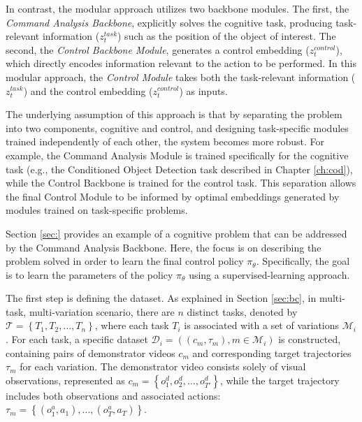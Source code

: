In contrast, the modular approach utilizes two backbone modules. The first, the \textit{Command Analysis Backbone}, explicitly solves the cognitive task, producing task-relevant information ($z^{task}_t$) such as the position of the object of interest. The second, the \textit{Control Backbone Module}, generates a control embedding ($z^{control}_t$), which directly encodes information relevant to the action to be performed. In this modular approach, the \textit{Control Module} takes both the task-relevant information ($z^{task}_t$) and the control embedding ($z^{control}_t$) as inputs.



The underlying assumption of this approach is that by separating the problem into two components, cognitive and control, and designing task-specific modules trained independently of each other, the system becomes more robust. For example, the Command Analysis Module is trained specifically for the cognitive task (e.g., the Conditioned Object Detection task described in Chapter \ref{ch:cod}), while the Control Backbone is trained for the control task. This separation allows the final Control Module to be informed by optimal embeddings generated by modules trained on task-specific problems.

Section \ref{sec:} provides an example of a cognitive problem that can be addressed by the Command Analysis Backbone. Here, the focus is on describing the problem solved in order to learn the final control policy $\pi_{\theta}$. Specifically, the goal is to learn the parameters of the policy $\pi_{\theta}$ using a supervised-learning approach.

The first step is defining the dataset. As explained in Section \ref{sec:bc}, in multi-task, multi-variation scenario, there are $n$ distinct tasks, denoted by $\mathcal{T} = \left\{T_{1}, T_{2}, \dots, T_{n}\right\}$, where each task $T_{i}$ is associated with a set of variations $\mathcal{M}_{i}$. For each task, a specific dataset $\mathcal{D}_{i} = ((c_{m}, \tau_{m}), m \in \mathcal{M}_{i})$ is constructed, containing pairs of demonstrator videos $c_{m}$ and corresponding target trajectories $\tau_{m}$ for each variation. The demonstrator video consists solely of visual observations, represented as $c_{m} = \left\{o^{d}_{1}, o^{d}_{2}, \dots, o^{d}_{T'}\right\}$, while the target trajectory includes both observations and associated actions: $\tau_{m} = \left\{(o^{a}_{1},a_{1}), \dots, (o^{a}_{T}, a_{T})\right\}$.

